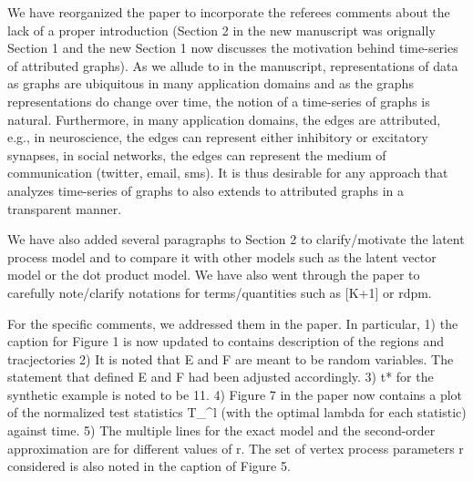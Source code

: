 We have reorganized the paper to incorporate the referees comments
about the lack of a proper introduction (Section 2 in the new
manuscript was orignally Section 1 and the new Section 1 now discusses
the motivation behind time-series of attributed graphs). As we allude
to in the manuscript, representations of data as
graphs are ubiquitous in many application
domains and as the graphs representations do change over time,
the notion of a time-series of graphs is natural. Furthermore, in many
application domains, the edges are attributed, e.g., in neuroscience,
the edges can represent either inhibitory or excitatory synapses, in
social networks, the edges can represent the medium of communication
(twitter, email, sms). It is thus desirable for 
any approach that analyzes time-series of
graphs to also extends to attributed graphs
in a transparent manner. 

We have also added several paragraphs to Section 2 to clarify/motivate the
latent process model and to compare it with other models such as the
latent vector model or the dot product model. We have also went
through the paper to carefully note/clarify notations for
terms/quantities such as [K+1] or rdpm. 

For the specific comments, we addressed them in the paper. In
particular, 
1) the caption for Figure 1 is now updated to contains
description of the regions and tracjectories 
2) It is noted that E and F are meant to be random variables. The
statement that defined E and F had been adjusted accordingly. 
3) t* for the synthetic example is noted to be 11.
4) Figure 7 in the paper now contains  a plot of the
normalized test statistics T_{\lambda}^{l} (with the optimal lambda
for each statistic) against time.
5) The multiple lines for the exact model and the second-order
approximation are for different values of r. The set of vertex process
parameters r considered is also noted in the caption of Figure 5.
